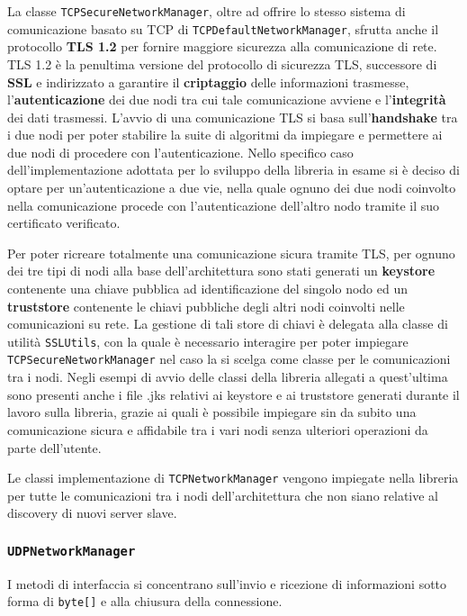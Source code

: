 La classe \texttt{TCPSecureNetworkManager}, oltre ad offrire lo stesso sistema di comunicazione basato su TCP di \texttt{TCPDefaultNetworkManager}, sfrutta anche il protocollo
\textbf{TLS 1.2} per fornire maggiore sicurezza alla comunicazione di rete. 
TLS 1.2 è la penultima versione del protocollo di sicurezza TLS, successore di \textbf{SSL} e indirizzato a garantire il \textbf{criptaggio} delle informazioni trasmesse,
l'\textbf{autenticazione} dei due nodi tra cui tale comunicazione avviene e l'\textbf{integrità} dei dati trasmessi.
L'avvio di una comunicazione TLS si basa sull'\textbf{handshake} tra i due nodi per poter stabilire la suite di algoritmi da impiegare e permettere ai due nodi di procedere con l'autenticazione.
Nello specifico caso dell'implementazione adottata per lo sviluppo della libreria in esame si è deciso di optare per un'autenticazione a due vie, nella quale ognuno dei due nodi coinvolto nella comunicazione
procede con l'autenticazione dell'altro nodo tramite il suo certificato verificato.

Per poter ricreare totalmente una comunicazione sicura tramite TLS, per ognuno dei tre tipi di nodi alla base dell'architettura sono stati generati un \textbf{keystore} contenente una chiave pubblica ad identificazione del singolo nodo ed un \textbf{truststore} contenente le chiavi pubbliche degli altri nodi coinvolti nelle comunicazioni su rete.
La gestione di tali store di chiavi è delegata alla classe di utilità \texttt{SSLUtils}, con la quale è necessario interagire per poter impiegare \texttt{TCPSecureNetworkManager} nel caso la si scelga come classe per le comunicazioni tra i nodi.
Negli esempi di avvio delle classi della libreria allegati a quest'ultima sono presenti anche i file .jks relativi ai keystore e ai truststore generati durante il lavoro sulla libreria, grazie ai quali è possibile impiegare sin da subito una comunicazione sicura e affidabile tra i vari nodi senza ulteriori operazioni da parte dell'utente.

Le classi implementazione di \texttt{TCPNetworkManager} vengono impiegate nella libreria per tutte le comunicazioni tra i nodi dell'architettura che non siano relative al discovery di nuovi server slave.

\subsubsection{\texttt{UDPNetworkManager}}
I metodi di interfaccia si concentrano sull'invio e ricezione di informazioni sotto forma di \texttt{byte[]} e
alla chiusura della connessione. 

